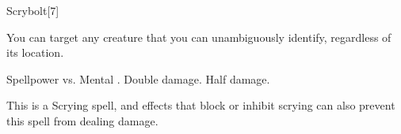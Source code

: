 \begin{spellsection}{Scrybolt}[7]
    \begin{spellheader}
    \end{spellheader}
    \begin{spellcontent}
        \begin{spelltargetinginfo}
        \end{spelltargetinginfo}
        \begin{spelleffects}
            \spellspecial You can target any creature that you can unambiguously identify, regardless of its location.
            \begin{spellattack}{Spellpower vs. Mental}
                \spellsuccess {}.
                \spellcritical Double damage.
                \spellfailure Half damage.
            \end{spellattack}
        \end{spelleffects}
    \end{spellcontent}
    \begin{spellfooter}
        \spellnotes This is a Scrying spell, and effects that block or inhibit scrying can also prevent this spell from dealing damage.
        \miscastexplode
    \end{spellfooter}
    \begin{spellaugments}
    \end{spellaugments}
\end{spellsection}

